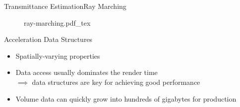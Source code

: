 \documentclass[
  english,            %
  aspectratio=169,    %
]{tumbeamer}
\begin{document}
\begin{frame}{Transmittance Estimation}{Ray Marching}
\begin{figure}[ht]
    \centering
    \def\svgwidth{0.6\columnwidth}
    {ray-marching.pdf_tex}
\end{figure}
\end{frame}

\begin{frame}{Acceleration Data Structures}
  \begin{itemize}
    \item Spatially-varying properties
    \item Data access usually dominates the render time \\
    $\implies$ data structures are key for achieving good performance
    \item Volume data can quickly grow into hundreds of gigabytes for production
  \end{itemize}
\end{frame}

\maketitle
\end{document}
